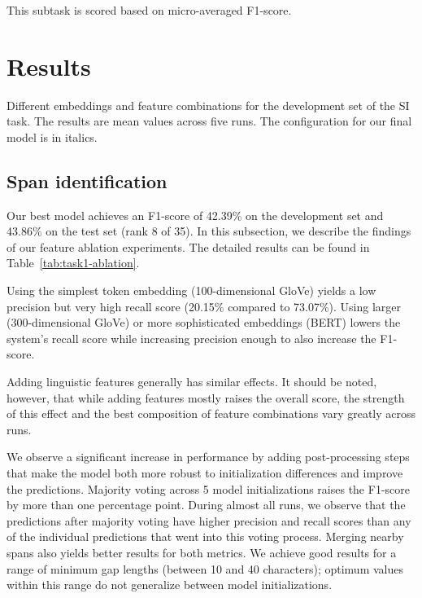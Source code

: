 \documentclass[11pt]{article}
\begin{document}
This subtask is scored based on micro-averaged F1-score.

\section{Results}


\begin{table}[t]
    \centering
    
    \caption{Different embeddings and feature combinations for the development set of the SI task. The results are mean values across five runs. The configuration for our final model is in italics.}
    \label{tab:task1-ablation}
\end{table}

\subsection{Span identification}

Our best model achieves an F1-score of 42.39\% on the development set and 43.86\% on the test set (rank 8 of 35).
In this subsection, we describe the findings of our feature ablation experiments.
The detailed results can be found in Table~\ref{tab:task1-ablation}.

Using the simplest token embedding (100-dimensional GloVe) yields a low precision but very high recall score (20.15\% compared to 73.07\%).
Using larger (300-dimensional GloVe) or more sophisticated embeddings (BERT) lowers the system's recall score while increasing precision enough to also increase the F1-score.

Adding linguistic features generally has similar effects.
It should be noted, however, that while adding features mostly raises the overall score,
the strength of this effect and the best composition of feature combinations vary greatly across runs.



We observe a significant increase in performance by adding post-processing steps that make the model both more robust to initialization differences and improve the predictions.
Majority voting across 5 model initializations raises the F1-score by more than one percentage point.
During almost all runs, we observe that the predictions after majority voting have higher precision and recall scores than any of the individual predictions that went into this voting process.
Merging nearby spans also yields better results for both metrics.
We achieve good results for a range of minimum gap lengths (between 10 and 40 characters); optimum values within this range do not generalize between model initializations.
\end{document}
